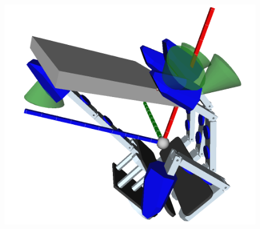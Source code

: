 \documentclass{book}
\begin{document}
\begin{figure}[H]
	\centering
	\begin{minipage} {.45\linewidth}
	  \includegraphics[width=\linewidth]{ContactPointsBox}
	\end{minipage}
\end{figure}	

\par
\end{document}
